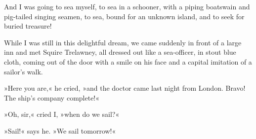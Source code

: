 And I was going to sea myself, to sea in a schooner, with a piping boatswain and pig-tailed singing seamen, to sea, bound for an unknown island, and to seek for buried treasure!

While I was still in this delightful dream, we came suddenly in front of a large inn and met Squire Trelawney, all dressed out like a sea-officer, in stout blue cloth, coming out of the door with a smile on his face and a capital imitation of a sailor's walk.

»Here you are,« he cried, »and the doctor came last night from London. Bravo! The ship's company complete!«

»Oh, sir,« cried I, »when do we sail?«

»Sail!« says he. »We sail tomorrow!«
